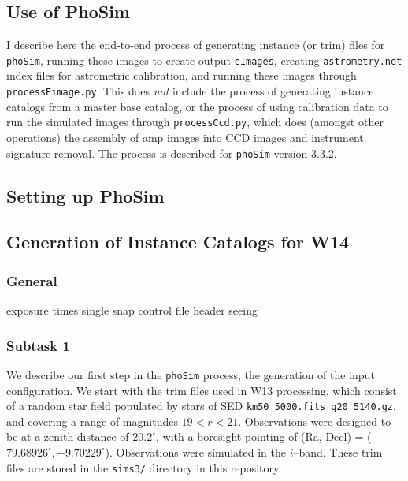 \documentclass[prd, nofootinbib, floatfix, 11pt, tightenlines, times]{article}
\begin{document}
\clearpage
\begin{appendices}
\section{Use of PhoSim}

I describe here the end-to-end process of generating instance (or
trim) files for {\tt phoSim}, running these images to create output
{\tt eImages}, creating {\tt astrometry.net} index files for
astrometric calibration, and running these images through {\tt
  processEimage.py}.  This does {\it not} include the process of
generating instance catalogs from a master base catalog, or the
process of using calibration data to run the simulated images through
{\tt processCcd.py}, which does (amongst other operations) the
assembly of amp images into CCD images and instrument signature
removal.  The process is described for {\tt phoSim} version 3.3.2.

\subsection{Setting up PhoSim}

\subsection{Generation of Instance Catalogs for W14 \label{appx:tasks}}

\subsubsection{General}
exposure times
single snap
control file
header
seeing

\subsubsection{Subtask 1}

We describe our first step in the {\tt phoSim} process, the generation
of the input configuration.  We start with the trim files used in W13
processing, which consist of a random star field populated by stars of
SED {\tt km50\_5000.fits\_g20\_5140.gz}, and covering a range of
magnitudes $19 < r < 21$.  Observations were designed to be at a
zenith distance of $20.2^{\circ}$, with a boresight pointing of (Ra,
Decl) = ($79.68926^{\circ}, -9.70229^{\circ}$).  Observations were
simulated in the $i$--band.  These trim files are stored in the {\tt sims3/}
directory in this repository.


\end{appendices}
\end{document}
